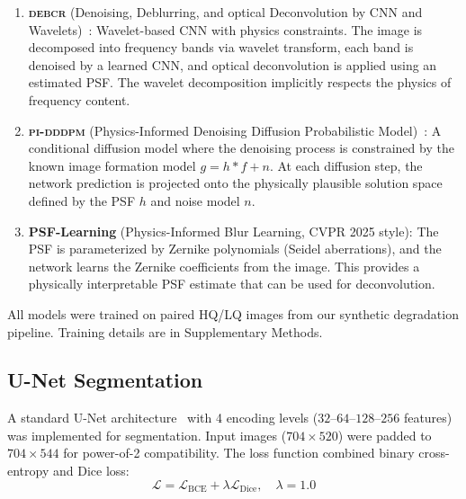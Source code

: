 \documentclass[11pt,a4paper]{article}
\newcommand{\debcr}{\textsc{debcr}\xspace}
\newcommand{\piddpm}{\textsc{pi-dddpm}\xspace}
\begin{document}
\begin{enumerate}[label=\textbf{M\arabic*:},leftmargin=3em]
    \item \textbf{\debcr} (Denoising, Deblurring, and optical
          Deconvolution by CNN and Wavelets)~\cite{li2024debcr}:
          Wavelet-based CNN with physics constraints. The image is
          decomposed into frequency bands via wavelet transform, each band
          is denoised by a learned CNN, and optical deconvolution is
          applied using an estimated PSF. The wavelet decomposition
          implicitly respects the physics of frequency content.

    \item \textbf{\piddpm} (Physics-Informed Denoising Diffusion
          Probabilistic Model)~\cite{wang2024piddpm}: A conditional
          diffusion model where the denoising process is constrained by
          the known image formation model $g = h * f + n$. At each
          diffusion step, the network prediction is projected onto the
          physically plausible solution space defined by the PSF $h$ and
          noise model $n$.

    \item \textbf{PSF-Learning} (Physics-Informed Blur
          Learning, CVPR 2025 style): The PSF is parameterized by
          Zernike polynomials (Seidel aberrations), and the network learns
          the Zernike coefficients from the image. This provides a
          physically interpretable PSF estimate that can be used for
          deconvolution.
\end{enumerate}

All models were trained on paired HQ/LQ images from our synthetic
degradation pipeline. Training details are in Supplementary Methods.

\subsection{U-Net Segmentation}
\label{sec:unet}

A standard U-Net architecture~\cite{ronneberger2015u} with 4 encoding
levels ($32$--$64$--$128$--$256$ features) was implemented for
segmentation. Input images ($704 \times 520$) were padded to
$704 \times 544$ for power-of-2 compatibility. The loss function
combined binary cross-entropy and Dice loss:
\begin{equation}
    \mathcal{L} = \mathcal{L}_{\text{BCE}} + \lambda \mathcal{L}_{\text{Dice}},
    \quad \lambda = 1.0
    \label{eq:unet_loss}
\end{equation}
\end{document}

